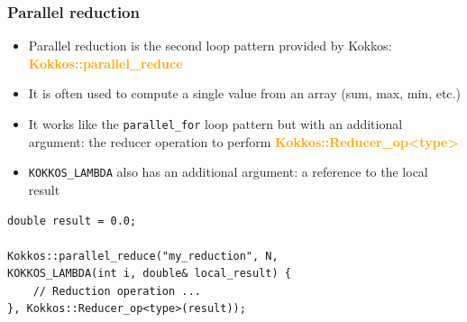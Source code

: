\documentclass[aspectratio=169]{beamer}
\newcommand{\highlight}[1]{\textcolor{orange}{\textbf{#1}}}
\begin{document}

\begin{frame}[fragile]
    \frametitle{Parallel reduction}

\begin{itemize}
\item Parallel reduction is the second loop pattern provided by Kokkos: \highlight{Kokkos::parallel\_reduce}
\item It is often used to compute a single value from an array (sum, max, min, etc.)
\item It works like the \texttt{parallel\_for} loop pattern but with an additional argument: the reducer operation to perform \highlight{Kokkos::Reducer\_op<type>}
\item \texttt{KOKKOS\_LAMBDA} also has an additional argument: a reference to the local result
\end{itemize}

\footnotesize
\begin{verbatim}
double result = 0.0;

Kokkos::parallel_reduce("my_reduction", N,
KOKKOS_LAMBDA(int i, double& local_result) {
    // Reduction operation ...
}, Kokkos::Reducer_op<type>(result));
\end{verbatim}

\end{frame}

\end{document}
